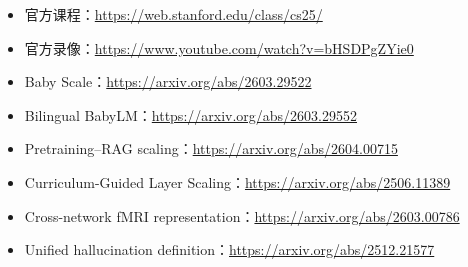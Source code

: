 \documentclass[a4paper]{article}
\begin{document}
\begin{itemize}
  \item 官方课程：\url{https://web.stanford.edu/class/cs25/}
  \item 官方录像：\url{https://www.youtube.com/watch?v=bHSDPgZYie0}
  \item Baby Scale：\url{https://arxiv.org/abs/2603.29522}
  \item Bilingual BabyLM：\url{https://arxiv.org/abs/2603.29552}
  \item Pretraining--RAG scaling：\url{https://arxiv.org/abs/2604.00715}
  \item Curriculum-Guided Layer Scaling：\url{https://arxiv.org/abs/2506.11389}
  \item Cross-network fMRI representation：\url{https://arxiv.org/abs/2603.00786}
  \item Unified hallucination definition：\url{https://arxiv.org/abs/2512.21577}
\end{itemize}
\end{document}
